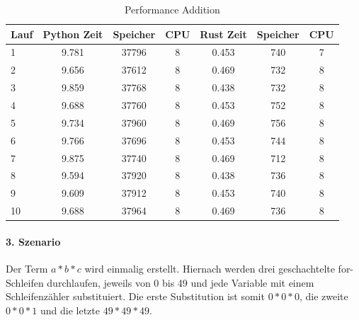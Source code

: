 \documentclass[11pt,a4paper, ngerman]{article}
\begin{document}
\begin{table}[ht!]
    \caption{Performance Addition}
    \centering
    \begin{tabular}{|l|c|c|c|c|c|c|}
        \hline
        \textbf{Lauf} & \textbf{Python Zeit} & \textbf{Speicher} & \textbf{CPU} & \textbf{Rust Zeit} & \textbf{Speicher} & \textbf{CPU} \\
        \hline
        1 & 9.781 & 37796 & 8 & 0.453 & 740 & 7 \\
        \hline
        2 & 9.656 & 37612 & 8 & 0.469 & 732 & 8 \\
        \hline
        3 & 9.859 & 37768 & 8 & 0.438 & 732 & 8 \\
        \hline
        4 & 9.688 & 37760 & 8 & 0.453 & 752 & 8 \\
        \hline
        5 & 9.734 & 37960 & 8 & 0.469 & 756 & 8 \\
        \hline
        6 & 9.766 & 37696 & 8 & 0.453 & 744 & 8 \\
        \hline
        7 & 9.875 & 37740 & 8 & 0.469 & 712 & 8 \\
        \hline
        8 & 9.594 & 37920 & 8 & 0.438 & 736 & 8 \\
        \hline
        9 & 9.609 & 37912 & 8 & 0.453 & 740 & 8 \\
        \hline
        10 & 9.688 & 37964 & 8 & 0.469 & 736 & 8 \\
        \hline
    \end{tabular}
\end{table}

\newpage

\paragraph{3. Szenario} Der Term $a*b*c$ wird einmalig erstellt. Hiernach werden drei geschachtelte for-Schleifen durchlaufen, jeweils von 0 bis 49 und jede Variable mit einem Schleifenzähler substituiert. Die erste Substitution ist somit $0*0*0$, die zweite $0*0*1$ und die letzte $49*49*49$.
\end{document}
